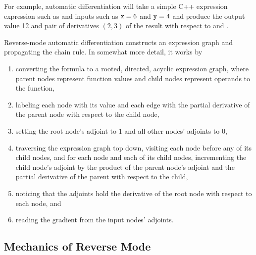 \documentclass[10pt]{article}
\begin{document}
For example, automatic differentiation will take a simple C++
expression expression such as  and inputs such as
${\tt x}=6$ and ${\tt y}=4$ and produce the output value 12 and pair
of derivatives $(2,3)$ of the result with respect to  and
.  

Reverse-mode automatic differentiation constructs an expression graph
and propagating the chain rule.  In somewhat more detail, it works by
%
\begin{enumerate}
\item converting the formula to a rooted, directed, acyclic expression graph,
  where parent nodes represent function values and child nodes
  represent operands to the function,
\item labeling each node with its value and each edge with 
  the partial derivative of the parent node with respect to the child
  node, 
\item setting the root node's adjoint  to 1 and all other nodes' adjoints
  to 0, 
\item traversing the expression graph top down, visiting each node
  before any of its child nodes, and for each node and each of its
  child nodes, incrementing the child node's adjoint by the product of
  the parent node's adjoint and the partial derivative of the parent
  with respect to the child,
\item noticing that the adjoints hold the derivative of the root node
  with respect to each node, and
\item reading the gradient from the input nodes' adjoints.
\end{enumerate}
%

\subsection{Mechanics of Reverse Mode}
\end{document}
